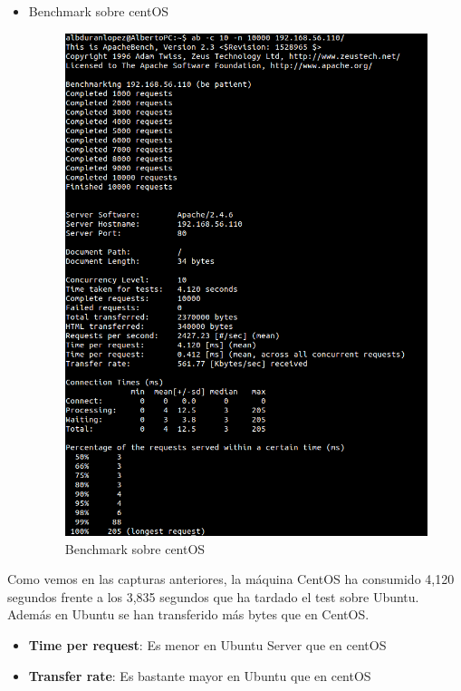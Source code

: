 \begin{itemize}
	
	\newpage
	\item Benchmark sobre centOS
	\begin{figure}[h]
		\centering
		\includegraphics[scale=0.3]{images/Bcentos.png}
		\caption{Benchmark sobre centOS}
	\end{figure}
	
\end{itemize}

Como vemos en las capturas anteriores, la máquina CentOS ha consumido 4,120 segundos frente a los 3,835 segundos que ha tardado el test sobre Ubuntu. Además en Ubuntu se han transferido más bytes que en CentOS.
\begin{itemize}
	\item \textbf{Time per request}: Es menor en Ubuntu Server que en centOS
	\item \textbf{Transfer rate}: Es bastante mayor en Ubuntu que en centOS
	
\end{itemize}

